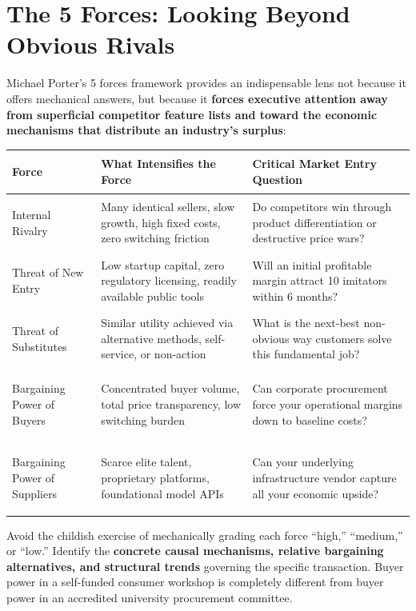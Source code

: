 \section{The 5 Forces: Looking Beyond Obvious Rivals}

Michael Porter's 5 forces framework provides an indispensable lens not because it offers mechanical answers, but because it \textbf{forces executive attention away from superficial competitor feature lists and toward the economic mechanisms that distribute an industry's surplus}:

\begin{tcolorbox}[
  enhanced,
  colback=BayesSurface!60,
  colframe=BayesBorder,
  boxrule=0.5pt,
  arc=3pt,
  left=3pt,right=3pt,top=3pt,bottom=3pt,
  boxsep=1pt
]
\scriptsize
\begin{tabularx}{\linewidth}{>{\bfseries\raggedright\arraybackslash}p{1.7cm} >{\raggedright\arraybackslash}p{2.4cm} X}
\toprule
\textbf{Force} & \textbf{What Intensifies the Force} & \textbf{Critical Market Entry Question} \\
\midrule
Internal Rivalry & Many identical sellers, slow growth, high fixed costs, zero switching friction & Do competitors win through product differentiation or destructive price wars? \\
\addlinespace[2pt]
Threat of New Entry & Low startup capital, zero regulatory licensing, readily available public tools & Will an initial profitable margin attract 10 imitators within 6 months? \\
\addlinespace[2pt]
Threat of Substitutes & Similar utility achieved via alternative methods, self-service, or non-action & What is the next-best non-obvious way customers solve this fundamental job? \\
\addlinespace[2pt]
Bargaining Power of Buyers & Concentrated buyer volume, total price transparency, low switching burden & Can corporate procurement force your operational margins down to baseline costs? \\
\addlinespace[2pt]
Bargaining Power of Suppliers & Scarce elite talent, proprietary platforms, foundational model APIs & Can your underlying infrastructure vendor capture all your economic upside? \\
\bottomrule
\end{tabularx}
\end{tcolorbox}

Avoid the childish exercise of mechanically grading each force ``high,'' ``medium,'' or ``low.'' Identify the \textbf{concrete causal mechanisms, relative bargaining alternatives, and structural trends} governing the specific transaction. Buyer power in a self-funded consumer workshop is completely different from buyer power in an accredited university procurement committee.

